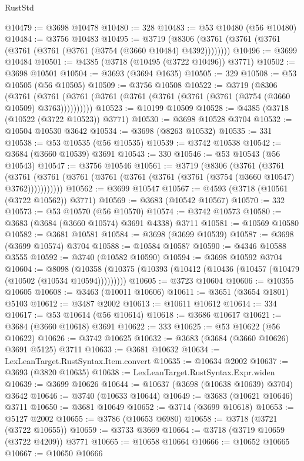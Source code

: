 \begin{lexlean}{RustStd}
\begin{coremodule}
{\begin{coremodule}
{{{{{{{{{{{{{{{{{{{{{{{{{{{{{{{{{{{{{{{{{{{{{{{@10479 := @3698 @10478
@10480 := 328
@10483 := @53 @10480 (@56 @10480)
@10484 := @3756 @10483
@10495 := @3719 (@8306 (@3761 (@3761 (@3761 (@3761 (@3761 (@3761 (@3754 (@3660 @10484) @4392))))))))
@10496 := @3699 @10484
@10501 := @4385 (@3718 (@10495 (@3722 @10496)) @3771)
@10502 := @3698 @10501
@10504 := @3693 (@3694 @1635)
@10505 := 329
@10508 := @53 @10505 (@56 @10505)
@10509 := @3756 @10508
@10522 := @3719
    (@8306
      (@3761 (@3761 (@3761 (@3761 (@3761 (@3761 (@3761 (@3761 (@3754 (@3660 @10509) @3763))))))))))
@10523 := @10199 @10509
@10528 := @4385 (@3718 (@10522 (@3722 @10523)) @3771)
@10530 := @3698 @10528 @3704
@10532 := @10504 @10530 @3642
@10534 := @3698 (@8263 @10532)
@10535 := 331
@10538 := @53 @10535 (@56 @10535)
@10539 := @3742 @10538
@10542 := @3684 (@3660 @10539) @3691
@10543 := 330
@10546 := @53 @10543 (@56 @10543)
@10547 := @3756 @10546
@10561 := @3719
    (@8306
      (@3761
        (@3761
          (@3761 (@3761 (@3761 (@3761 (@3761 (@3761 (@3761 (@3754 (@3660 @10547) @3762)))))))))))
@10562 := @3699 @10547
@10567 := @4593 (@3718 (@10561 (@3722 @10562)) @3771)
@10569 := @3683 (@10542 @10567)
@10570 := 332
@10573 := @53 @10570 (@56 @10570)
@10574 := @3742 @10573
@10580 := @3683 (@3684 (@3660 @10574) @3691 @4338) @3711
@10581 := @10569 @10580
@10582 := @3681 @10581
@10584 := @3698 (@3699 @10539)
@10587 := @3698 (@3699 @10574) @3704
@10588 := @10584 @10587
@10590 := @4346 @10588 @3555
@10592 := @3740 (@10582 @10590)
@10594 := @3698 @10592 @3704
@10604 := @8098
    (@10358 (@10375 (@10393 (@10412 (@10436 (@10457 (@10479 (@10502 (@10534 @10594)))))))))
@10605 := @3723 @10604
@10606 := @10355 @10605
@10608 := @3463 (@10011 @10606)
@10611 := @3651 (@3654 @1801) @5103
@10612 := @3487 @2002
@10613 := @10611 @10612
@10614 := 334
@10617 := @53 @10614 (@56 @10614)
@10618 := @3686 @10617
@10621 := @3684 (@3660 @10618) @3691
@10622 := 333
@10625 := @53 @10622 (@56 @10622)
@10626 := @3742 @10625
@10632 := @3683 (@3684 (@3660 @10626) @3691 @5125) @3711
@10633 := @3681 @10632
@10634 := LexLeanTarget.RustSyntax.Item.convert
@10635 := @10634 @2002
@10637 := @3693 (@3820 @10635)
@10638 := LexLeanTarget.RustSyntax.Expr.widen
@10639 := @3699 @10626
@10644 := @10637 (@3698 (@10638 @10639) @3704) @3642
@10646 := @3740 (@10633 @10644)
@10649 := @3683 (@10621 @10646) @3711
@10650 := @3681 @10649
@10652 := @3714 (@3699 @10618)
@10653 := @5127 @2002
@10655 := @3786 (@10653 @6980)
@10658 := @3718 (@3721 (@3722 @10655))
@10659 := @3733 @3669
@10664 := @3718 (@3719 @10659 (@3722 @4209)) @3771
@10665 := @10658 @10664
@10666 := @10652 @10665
@10667 := @10650 @10666
}}}}}}}}}}}}}}}}}}}}}}}}}}}}}}}}}}}}}}}}}}}}}}}
\end{coremodule}}
\end{coremodule}
\end{lexlean}
